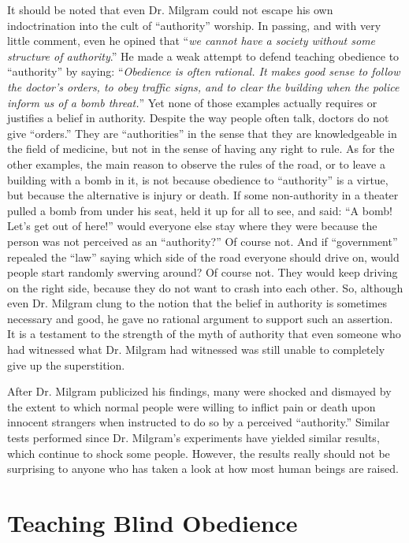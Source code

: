 \documentclass{book}
\begin{document}
It should be noted that even Dr. Milgram could not escape his own indoctrination into the cult of \enquote{authority} worship. In passing, and with very little comment, even he opined that \enquote{\emph{we cannot have a society without some structure of authority}.} He made a weak attempt to defend teaching obedience to \enquote{authority} by saying: \enquote{\emph{Obedience is often rational. It makes good sense to follow the doctor's orders, to obey traffic signs, and to clear the building when the police inform us of a bomb threat.}} Yet none of those examples actually requires or justifies a belief in authority. Despite the way people often talk, doctors do not give \enquote{orders.} They are \enquote{authorities} in the sense that they are knowledgeable in the field of medicine, but not in the sense of having any right to rule. As for the other examples, the main reason to observe the rules of the road, or to leave a building with a bomb in it, is not because obedience to \enquote{authority} is a virtue, but because the alternative is injury or death. If some non-authority in a theater pulled a bomb from under his seat, held it up for all to see, and said: \enquote{A bomb! Let's get out of here!} would everyone else stay where they were because the person was not perceived as an \enquote{authority?} Of course not. And if \enquote{government} repealed the \enquote{law} saying which side of the road everyone should drive on, would people start randomly swerving around? Of course not. They would keep driving on the right side, because they do not want to crash into each other. So, although even Dr. Milgram clung to the notion that the belief in authority is sometimes necessary and good, he gave no rational argument to support such an assertion. It is a testament to the strength of the myth of authority that even someone who had witnessed what Dr. Milgram had witnessed was still unable to completely give up the superstition.

After Dr. Milgram publicized his findings, many were shocked and dismayed by the extent to which normal people were willing to inflict pain or death upon innocent strangers when instructed to do so by a perceived \enquote{authority.} Similar tests performed since Dr. Milgram's experiments have yielded similar results, which continue to shock some people. However, the results really should not be surprising to anyone who has taken a look at how most human beings are raised.

\section{Teaching Blind Obedience}
\end{document}
